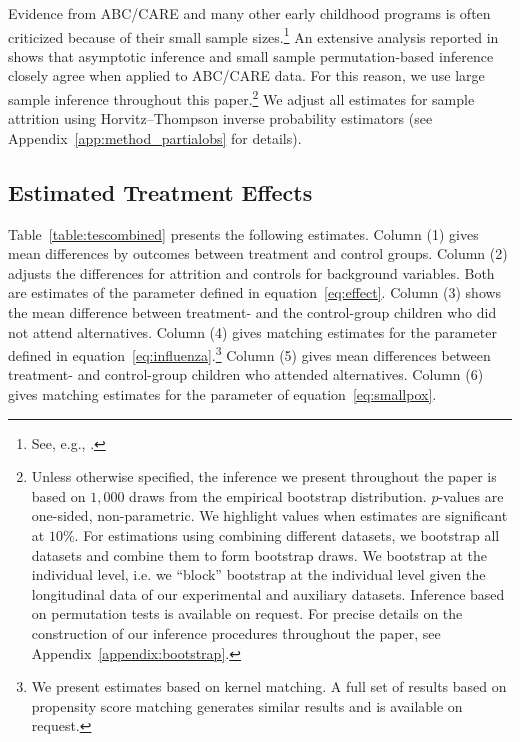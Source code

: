 Evidence from ABC/CARE and many other early childhood programs is often criticized because of their small sample sizes.\footnote{See, e.g., \cite{Murray_2013_GivingKids_JJHBOOK}.} An extensive analysis reported in \citet{Campbell_Conti_etal_2014_EarlyChildhoodInvestments} shows that asymptotic inference and small sample permutation-based inference closely agree when applied to ABC/CARE data. For this reason, we use large sample inference throughout this paper.\footnote{Unless otherwise specified, the inference we present throughout the paper is based on $1,000$ draws from the empirical bootstrap distribution. $p$-values are one-sided, non-parametric. We highlight values when estimates are significant at $10\%$. For estimations using combining different datasets, we bootstrap all datasets and combine them to form bootstrap draws. We bootstrap at the individual level, i.e. we ``block'' bootstrap at the individual level given the longitudinal data of our experimental and auxiliary datasets. Inference based on permutation tests is available on request. For precise details on the construction of our inference procedures throughout the paper, see Appendix~\ref{appendix:bootstrap}.} We adjust all estimates for sample attrition using Horvitz--Thompson \citeyearpar{Horvitz_Thompson_1952_JASA} inverse probability estimators (see Appendix~\ref{app:method_partialobs} for details).

\subsection{Estimated Treatment Effects}

Table~\ref{table:tescombined} presents the following estimates. Column (1) gives mean differences by outcomes between treatment and control groups. Column (2) adjusts the differences for attrition and controls for background variables. Both are estimates of the parameter defined in equation~\eqref{eq:effect}. Column (3) shows the mean difference between treatment- and the control-group children who did not attend alternatives. Column (4) gives matching estimates for the parameter defined in equation~\eqref{eq:influenza}.\footnote{We present estimates based on kernel matching. A full set of results based on propensity score matching generates similar results and is available on request.} Column (5) gives mean differences between treatment- and control-group children who attended alternatives. Column (6) gives matching estimates for the parameter of equation~\eqref{eq:smallpox}.

